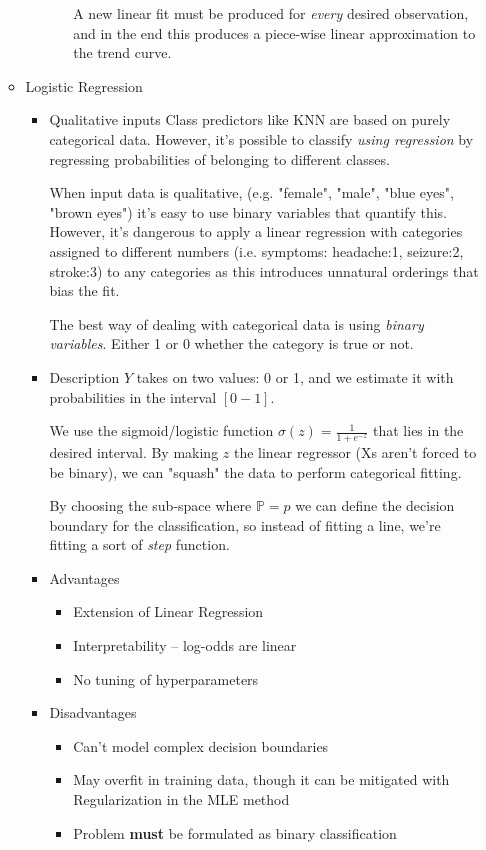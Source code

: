 \documentclass[11pt]{article}
\begin{document}
\begin{itemize}
\begin{itemize}
\begin{itemize}
\begin{itemize}
A new linear fit must be produced for \emph{every} desired observation, and in the end this produces a piece-wise linear approximation to the trend curve.
\end{itemize}
\end{itemize}
\item Logistic Regression
\label{sec-3-2-2-2}
\begin{itemize}
\item Qualitative inputs
\label{sec-3-2-2-2-1}
Class predictors like KNN are based on purely categorical data. However, it's possible to classify \emph{using regression} by regressing probabilities of belonging to different classes.

When input data is qualitative, (e.g. "female", "male", "blue eyes", "brown eyes") it's easy to use binary variables that quantify this. However, it's dangerous to apply a linear regression with categories assigned to different numbers (i.e. symptoms: headache:1, seizure:2, stroke:3) to any categories as this introduces unnatural orderings that bias the fit.

The best way of dealing with categorical data is using \emph{binary variables}. Either 1 or 0 whether the category is true or not.
\item Description
\label{sec-3-2-2-2-2}
$Y$ takes on two values: 0 or 1, and we estimate it with probabilities in the interval $[0-1]$. 

We use the sigmoid/logistic function $\sigma(z)=\frac{1}{1+e^{-z}}$ that lies in the desired interval. By making $z$ the linear regressor (Xs aren't forced to be binary), we can "squash" the data to perform categorical fitting.

By choosing the sub-space where $\mathbb{P}=p$ we can define the decision boundary for the classification, so instead of fitting a line, we're fitting a sort of \emph{step} function.
\item Advantages
\label{sec-3-2-2-2-3}
\begin{itemize}
\item Extension of Linear Regression
\item Interpretability -- log-odds are linear
\item No tuning of hyperparameters
\end{itemize}
\item Disadvantages
\label{sec-3-2-2-2-4}
\begin{itemize}
\item Can't model complex decision boundaries
\item May overfit in training data, though it can be mitigated with Regularization in the MLE method
\item Problem \textbf{must} be formulated as binary classification
\end{itemize}
\end{itemize}
\end{itemize}


\end{itemize}
\end{document}

